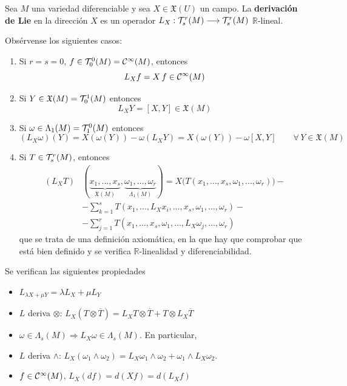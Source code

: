\begin{defi}
    Sea $M$ una variedad diferenciable y sea $X \in \mathfrak X(U)$ un campo. La \textbf{derivaci\'on de Lie} en la direcci\'on $X$ es un operador $L_X: \mathcal{T}_s^r(M) \longrightarrow \mathcal{T}_s^r(M)$ $\mathbb R$-lineal.
\end{defi}
Obs\'ervense los siguientes casos:\vspace{-3mm}
\begin{enumerate}
    \item Si $r=s=0$, $f\in \mathcal{T}_0^0(M) = \mathcal{C}^{\infty}(M)$, entonces
    $$L_Xf=X\,f\in \mathcal{C}^{\infty}(M)$$
    \item Si $Y \in \mathfrak X(M)=\mathcal{T}_0^1(M)$ entonces
    $$L_XY=[X,Y] \in \mathfrak X(M)$$
    \item Si $\omega \in \Lambda_1(M) =\mathcal{T}_1^0(M)$ entonces
    $$(L_X\omega)(Y)=X(\omega(Y))-\omega(L_XY) = X(\omega(Y))-\omega[X,Y]\qquad \forall \, Y \in \mathfrak X(M)$$
    \item Si $T\in \mathcal{T}_s^r(M)$, entonces
    \[\begin{split}
        (L_XT)&(\underbrace{x_1,\ldots,x_s}_{\mathfrak X(M)},\underbrace{\omega_1,\ldots,\omega_r}_{\Lambda_1(M)}) = X\big(T(x_1,\ldots,x_s,\omega_1,\ldots,\omega_r)\big) - \\ & -\sum_{k=1}^s T(x_1,\ldots,L_Xx_i, \ldots, x_s,\omega_1,\ldots,\omega_r) - \\ & - \sum_{j=1}^r T(x_1,\ldots,x_s,\omega_1,\ldots,L_X\omega_j, \ldots, \omega_r)
    \end{split}\]
    que se trata de una definici\'on axiom\'atica, en la que hay que comprobar que est\'a bien definido y se verifica $\mathbb R$-linealidad y diferenciabilidad. 
\end{enumerate}
\begin{propis}
    Se verifican las siguientes propiedades \vspace{-3mm}
    \begin{itemize}
        \item $L_{\lambda X+\mu Y}=\lambda L_X+\mu L_Y$
        \item $L$ deriva $\otimes$: $L_X(T\otimes \overline{T})= L_X T \otimes \overline{T} + T \otimes L_X \overline{T}$
        \item $\omega \in \Lambda_s(M)\Rightarrow L_X\omega \in \Lambda_s(M)$. En particular,
        \item $L$ deriva $\wedge$: $L_X(\omega_1\wedge \omega_2)=L_X\omega_1\wedge \omega_2 + \omega_1 \wedge L_X\omega_2$.
        \item $f\in \mathcal{C}^{\infty}(M)$, $L_X(df)=d(Xf)=d(L_Xf)$
    \end{itemize}
\end{propis}
